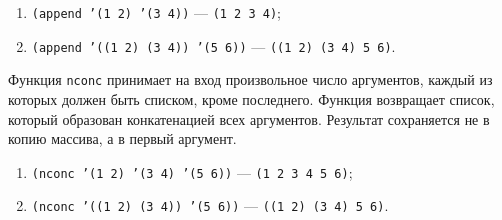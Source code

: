 \begin{enumerate}
	\item[] \texttt{(append '(1 2) '(3 4))} --- \texttt{(1 2 3 4)};
	\item[] \texttt{(append '((1 2) (3 4)) '(5 6))} --- \texttt{((1 2) (3 4) 5 6)}.
\end{enumerate}

Функция \texttt{nconc} принимает на вход произвольное число аргументов, каждый из которых должен быть списком, кроме последнего. Функция возвращает список, который образован конкатенацией всех аргументов. Результат сохраняется не в копию массива, а в первый аргумент.

\begin{enumerate}
	\item[] \texttt{(nconc '(1 2) '(3 4) '(5 6))} --- \texttt{(1 2 3 4 5 6)};
	\item[] \texttt{(nconc '((1 2) (3 4)) '(5 6))} --- \texttt{((1 2) (3 4) 5 6)}.
\end{enumerate}
